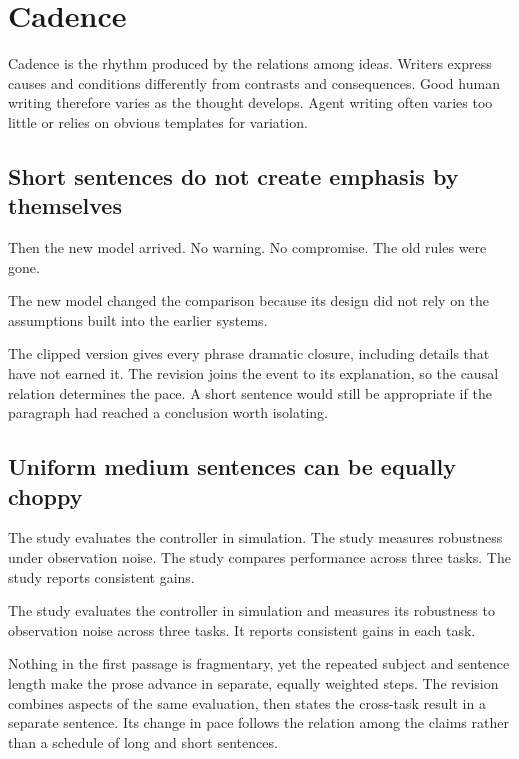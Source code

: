 \section{Cadence}
\label{sec:syntax}

Cadence is the rhythm produced by the relations among ideas. Writers express
causes and conditions differently from contrasts and consequences. Good human
writing therefore varies as the thought develops. Agent writing often varies
too little or relies on obvious templates for variation.

\subsection{Short sentences do not create emphasis by themselves}

\agentdraft

Then the new model arrived. No warning. No compromise. The old rules were
gone.

\humanrevision

The new model changed the comparison because its design did not rely on the
assumptions built into the earlier systems.

The clipped version gives every phrase dramatic closure, including details
that have not earned it. The revision joins the event to its explanation, so
the causal relation determines the pace. A short sentence would still be
appropriate if the paragraph had reached a conclusion worth isolating.

\subsection{Uniform medium sentences can be equally choppy}

\agentdraft

The study evaluates the controller in simulation. The study measures
robustness under observation noise. The study compares performance across
three tasks. The study reports consistent gains.

\humanrevision

The study evaluates the controller in simulation and measures its robustness
to observation noise across three tasks. It reports consistent gains in each
task.

Nothing in the first passage is fragmentary, yet the repeated subject and
sentence length make the prose advance in separate, equally weighted steps.
The revision combines aspects of the same evaluation, then states the
cross-task result in a separate sentence. Its change in pace follows the
relation among the claims rather than a schedule of long and short sentences.

